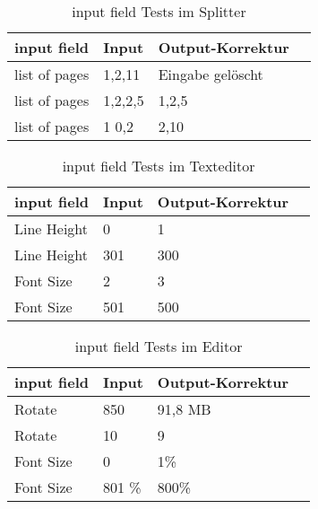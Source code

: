 \begin{table}[!htbp]
	\centering
	\begin{tabular}{|p{4cm}|p{3cm}|p{3cm}|p{3cm}|}
		\hline
		\textbf{input field}													& \textbf{Input} 	& \textbf{Output-Korrektur}		\\ 
		\hline
		list of pages	& 1,2,11						& Eingabe gelöscht  						\\ 
		list of pages	& 1,2,2,5						& 1,2,5 						\\ 
		list of pages					& 1 0,2						& 2,10		\\ 
		\hline
	\end{tabular}
	\caption{input field Tests im Splitter}
	\label{table:splitter-input}
\end{table}

\begin{table}[!htbp]
	\centering
	\begin{tabular}{|p{4cm}|p{3cm}|p{3cm}|p{3cm}|}
		\hline
		\textbf{input field}													& \textbf{Input} 	& \textbf{Output-Korrektur}		\\ 
		\hline
		Line Height 													& 0 						& 1  							\\
		Line Height												& 301 						& 300 					\\ 
		Font Size 													& 2						& 3  							\\
		Font Size									& 501						& 500 					\\ 
		\hline
	\end{tabular}
	\caption{input field Tests im Texteditor}
	\label{table:text-input}
\end{table}

\begin{table}[!htbp]
	\centering
	\begin{tabular}{|p{4cm}|p{3cm}|p{3cm}|p{3cm}|}
		\hline
		\textbf{input field}													& \textbf{Input} 	& \textbf{Output-Korrektur}		\\ 
		\hline
		Rotate													& 850 						& 91,8 MB  							\\
		Rotate												& 10 						& 9 					\\ 
		Font Size 													& 0						& 1\%  							\\
		Font Size									& 801 \% 						& 800\% 					\\ 
		\hline
	\end{tabular}
	\caption{input field Tests im Editor}
	\label{table:text-input}
\end{table}

